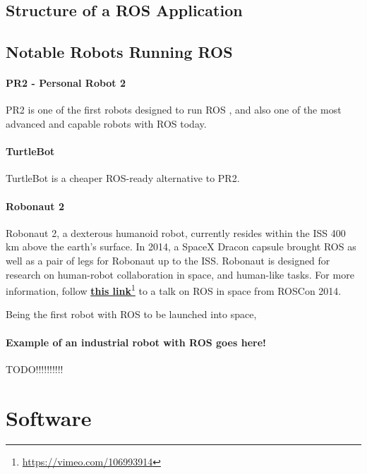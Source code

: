 \subsection{Structure of a ROS Application}

\subsection{Notable Robots Running ROS}

\paragraph{PR2 - Personal Robot 2}

PR2 is one of the first robots designed to run \ac{ROS} \cite{rosbook15}, and also one of the most advanced and capable robots with \ac{ROS} today. 

\paragraph{TurtleBot} 

TurtleBot is a cheaper ROS-ready alternative to PR2. 

\paragraph{Robonaut 2}

Robonaut 2, a dexterous humanoid robot, currently resides within the \ac{ISS} 400 km above the earth's surface. In 2014, a SpaceX Dracon capsule brought \ac{ROS} as well as a pair of legs for Robonaut up to the \ac{ISS}\cite{ROS_space}. Robonaut is designed for research on human-robot collaboration in space, and human-like tasks. For more information, follow \href{https://vimeo.com/106993914}{\textbf{this link}}\footnote{\url{https://vimeo.com/106993914}} to a talk on \ac{ROS} in space from ROSCon 2014.

Being the first robot with \ac{ROS} to be launched into space, 

\paragraph{Example of an industrial robot with ROS goes here!}

TODO!!!!!!!!!!

\section{Software}


